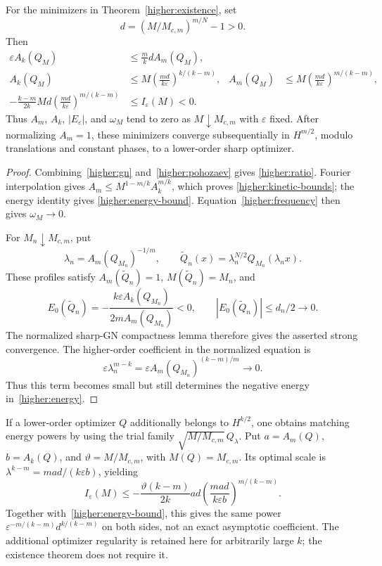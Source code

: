 \begin{proposition}\label{higher:low-frequency}
For the minimizers in Theorem~\ref{higher:existence}, set
\[d=(M/M_{c,m})^{m/N}-1>0.\]
Then
\begin{align}
 \varepsilon A_k(Q_M)&\le\frac mk d A_m(Q_M),
       \label{higher:ratio}\\
 A_k(Q_M)&\le M\left(\frac{m d}{k\varepsilon}\right)^{k/(k-m)},
 & A_m(Q_M)&\le M\left(\frac{m d}{k\varepsilon}\right)^{m/(k-m)},
       \label{higher:kinetic-bounds}\\
 -\frac{k-m}{2k}M d
  \left(\frac{m d}{k\varepsilon}\right)^{m/(k-m)}
     &\le I_\varepsilon(M)<0.
       \label{higher:energy-bound}
\end{align}
Thus $A_m$, $A_k$, $|E_\varepsilon|$, and $\omega_M$ tend to zero
as $M\downarrow M_{c,m}$ with $\varepsilon$ fixed. After normalizing
$A_m=1$, these minimizers converge subsequentially in $H^{m/2}$,
modulo translations and constant phases, to a lower-order sharp
optimizer.
\end{proposition}
\begin{proof}
Combining~\eqref{higher:gn} and~\eqref{higher:pohozaev} gives
\eqref{higher:ratio}. Fourier interpolation gives
$A_m\le M^{1-m/k}A_k^{m/k}$, which proves
\eqref{higher:kinetic-bounds}; the energy identity gives
\eqref{higher:energy-bound}. Equation~\eqref{higher:frequency}
then gives $\omega_M\to0$.

For $M_n\downarrow M_{c,m}$, put
\[
 \lambda_n=A_m(Q_{M_n})^{-1/m},\qquad
 \widetilde Q_n(x)=\lambda_n^{N/2}Q_{M_n}(\lambda_nx).
\]
These profiles satisfy $A_m(\widetilde Q_n)=1$, $M(\widetilde Q_n)=M_n$,
and
\[
 E_0(\widetilde Q_n)
 =-\frac{k\varepsilon A_k(Q_{M_n})}{2mA_m(Q_{M_n})}<0,
 \qquad |E_0(\widetilde Q_n)|\le d_n/2\longrightarrow0.
\]
The normalized sharp-GN compactness lemma therefore gives the
asserted strong convergence. The higher-order coefficient in the
normalized equation is
\[
 \varepsilon\lambda_n^{m-k}
       =\varepsilon A_m(Q_{M_n})^{(k-m)/m}\longrightarrow0.
\]
Thus this term becomes small but still determines the negative
energy in~\eqref{higher:energy}.
\end{proof}

If a lower-order optimizer $Q$ additionally belongs to $H^{k/2}$,
one obtains matching energy powers by using the trial family
$\sqrt{M/M_{c,m}}\,Q_\lambda$. Put $a=A_m(Q)$, $b=A_k(Q)$,
and $\vartheta=M/M_{c,m}$, with $M(Q)=M_{c,m}$. Its optimal scale
is $\lambda^{k-m}=m a d/(k\varepsilon b)$, yielding
\begin{equation}\label{higher:energy-upper}
 I_\varepsilon(M)\le
 -\frac{\vartheta(k-m)}{2k}a d
       \left(\frac{m a d}{k\varepsilon b}\right)^{m/(k-m)}.
\end{equation}
Together with~\eqref{higher:energy-bound}, this gives the same power
$\varepsilon^{-m/(k-m)}d^{k/(k-m)}$ on both sides, not an exact
asymptotic coefficient. The additional optimizer regularity is
retained here for arbitrarily large $k$; the existence theorem does
not require it.

